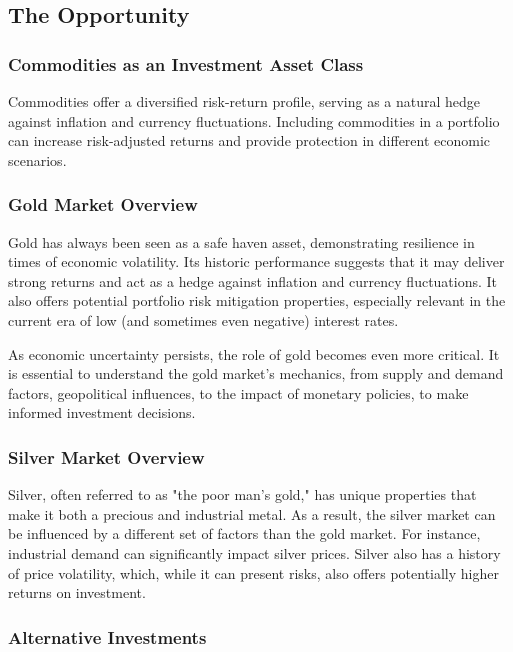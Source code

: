 \documentclass[11pt]{article}
\begin{document}
\subsection{The Opportunity}

\subsubsection{Commodities as an Investment Asset Class}

Commodities offer a diversified risk-return profile, serving as a natural hedge against inflation and currency fluctuations. Including commodities in a portfolio can increase risk-adjusted returns and provide protection in different economic scenarios.


\subsubsection{Gold Market Overview}

Gold has always been seen as a safe haven asset, demonstrating resilience in times of economic volatility. Its historic performance suggests that it may deliver strong returns and act as a hedge against inflation and currency fluctuations. It also offers potential portfolio risk mitigation properties, especially relevant in the current era of low (and sometimes even negative) interest rates.


As economic uncertainty persists, the role of gold becomes even more critical. It is essential to understand the gold market's mechanics, from supply and demand factors, geopolitical influences, to the impact of monetary policies, to make informed investment decisions.


\subsubsection{Silver Market Overview}

Silver, often referred to as "the poor man's gold," has unique properties that make it both a precious and industrial metal. As a result, the silver market can be influenced by a different set of factors than the gold market. For instance, industrial demand can significantly impact silver prices. Silver also has a history of price volatility, which, while it can present risks, also offers potentially higher returns on investment.


\subsubsection{Alternative Investments}
\end{document}
